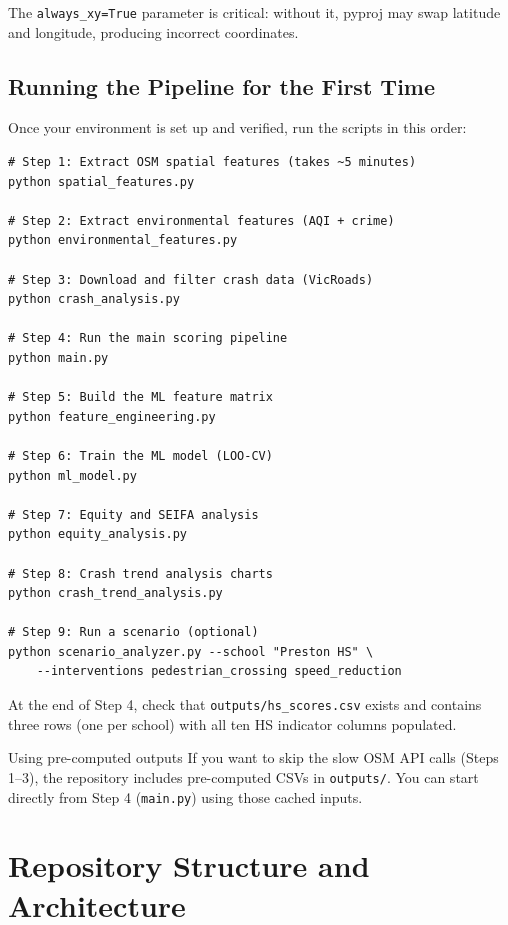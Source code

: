 \documentclass[11pt,a4paper,openany]{book}
\begin{document}
The \texttt{always\_xy=True} parameter is critical: without it, pyproj may swap latitude and longitude, producing incorrect coordinates.

\section{Running the Pipeline for the First Time}

Once your environment is set up and verified, run the scripts in this order:

\begin{lstlisting}[style=bash, caption={Full pipeline execution sequence}]
# Step 1: Extract OSM spatial features (takes ~5 minutes)
python spatial_features.py

# Step 2: Extract environmental features (AQI + crime)
python environmental_features.py

# Step 3: Download and filter crash data (VicRoads)
python crash_analysis.py

# Step 4: Run the main scoring pipeline
python main.py

# Step 5: Build the ML feature matrix
python feature_engineering.py

# Step 6: Train the ML model (LOO-CV)
python ml_model.py

# Step 7: Equity and SEIFA analysis
python equity_analysis.py

# Step 8: Crash trend analysis charts
python crash_trend_analysis.py

# Step 9: Run a scenario (optional)
python scenario_analyzer.py --school "Preston HS" \
    --interventions pedestrian_crossing speed_reduction
\end{lstlisting}

At the end of Step 4, check that \texttt{outputs/hs\_scores.csv} exists and contains three rows (one per school) with all ten HS indicator columns populated.

\begin{tipbox}{Using pre-computed outputs}
If you want to skip the slow OSM API calls (Steps 1--3), the repository includes pre-computed CSVs in \texttt{outputs/}. You can start directly from Step 4 (\texttt{main.py}) using those cached inputs.
\end{tipbox}

\chapter{Repository Structure and Architecture}
\end{document}
